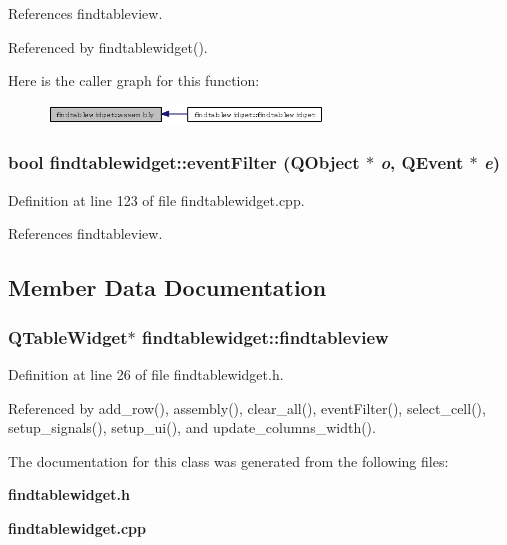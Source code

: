 References findtableview.

Referenced by findtablewidget().

Here is the caller graph for this function:\begin{figure}[H]
\begin{center}
\leavevmode
\includegraphics[width=207pt]{classfindtablewidget_ce0d13010998778d2d9b18a76a66442d_icgraph}
\end{center}
\end{figure}
\subsubsection{\setlength{\rightskip}{0pt plus 5cm}bool findtablewidget::event\-Filter (QObject $\ast$ {\em o}, QEvent $\ast$ {\em e})\hspace{0.3cm}{\tt  [private]}}\label{classfindtablewidget_37e8a0db7b8e6c0f6a48fcffdafc343c}




Definition at line 123 of file findtablewidget.cpp.

References findtableview.

\subsection{Member Data Documentation}
\subsubsection{\setlength{\rightskip}{0pt plus 5cm}QTable\-Widget$\ast$ {\bf findtablewidget::findtableview}\hspace{0.3cm}{\tt  [private]}}\label{classfindtablewidget_00c9dfe708d23bd0b80a476f40ab0cc3}




Definition at line 26 of file findtablewidget.h.

Referenced by add\_\-row(), assembly(), clear\_\-all(), event\-Filter(), select\_\-cell(), setup\_\-signals(), setup\_\-ui(), and update\_\-columns\_\-width().

The documentation for this class was generated from the following files:\begin{CompactItemize}
\item 
{\bf findtablewidget.h}\item 
{\bf findtablewidget.cpp}\end{CompactItemize}
